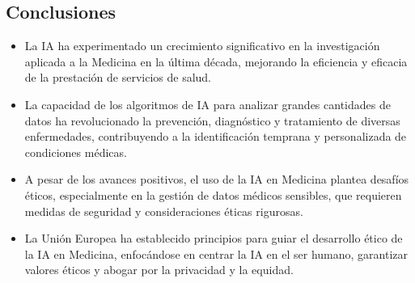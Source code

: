 \documentclass[10pt]{article}
\begin{document}
        
    
\begin{center}
    \section{Conclusiones}
\end{center}

        \begin{itemize}
            \item La IA ha experimentado un crecimiento significativo en la investigación aplicada a la Medicina en la última década, mejorando la eficiencia y eficacia de la prestación de servicios de salud.
            \item La capacidad de los algoritmos de IA para analizar grandes cantidades de datos ha revolucionado la prevención, diagnóstico y tratamiento de diversas enfermedades, contribuyendo a la identificación temprana y personalizada de condiciones médicas.
            \item A pesar de los avances positivos, el uso de la IA en Medicina plantea desafíos éticos, especialmente en la gestión de datos médicos sensibles, que requieren medidas de seguridad y consideraciones éticas rigurosas.
            \item La Unión Europea ha establecido principios para guiar el desarrollo ético de la IA en Medicina, enfocándose en centrar la IA en el ser humano, garantizar valores éticos y abogar por la privacidad y la equidad.
        \end{itemize}

\vspace{0.5cm}

\nocite{*}
\begin{center}
   \printbibliography[title={Referencias}]
\end{center}

    
\end{document}
